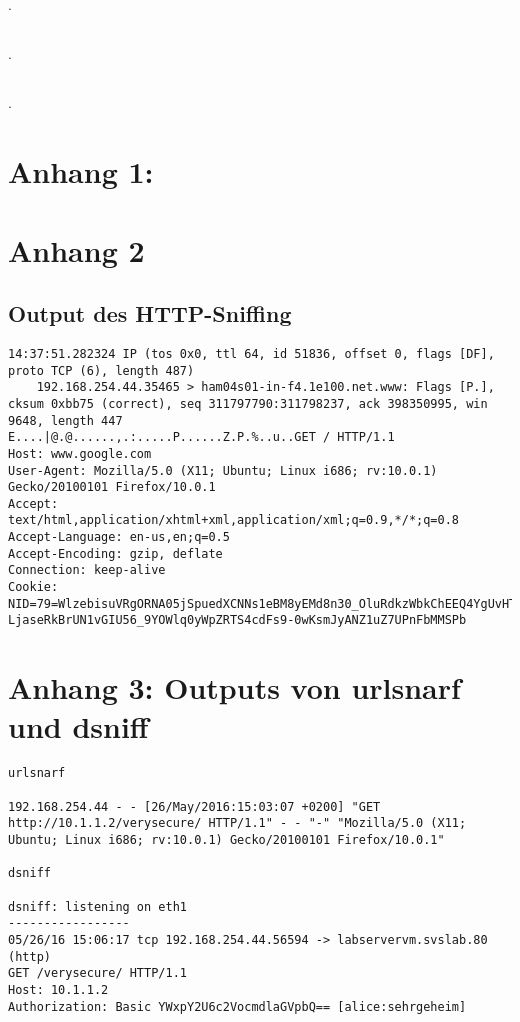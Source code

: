 \documentclass[twoside]{article}
\begin{document}
\subsection{}.
\subsection{}.
\subsection{}.

\newpage
\section*{Anhang 1:}

\section*{Anhang 2}
\subsection*{Output des HTTP-Sniffing}
\begin{lstlisting}
14:37:51.282324 IP (tos 0x0, ttl 64, id 51836, offset 0, flags [DF], proto TCP (6), length 487)
    192.168.254.44.35465 > ham04s01-in-f4.1e100.net.www: Flags [P.], cksum 0xbb75 (correct), seq 311797790:311798237, ack 398350995, win 9648, length 447
E....|@.@......,.:.....P......Z.P.%..u..GET / HTTP/1.1
Host: www.google.com
User-Agent: Mozilla/5.0 (X11; Ubuntu; Linux i686; rv:10.0.1) Gecko/20100101 Firefox/10.0.1
Accept: text/html,application/xhtml+xml,application/xml;q=0.9,*/*;q=0.8
Accept-Language: en-us,en;q=0.5
Accept-Encoding: gzip, deflate
Connection: keep-alive
Cookie: NID=79=WlzebisuVRgORNA05jSpuedXCNNs1eBM8yEMd8n30_OluRdkzWbkChEEQ4YgUvHTWB3a64hs LjaseRkBrUN1vGIU56_9YOWlq0yWpZRTS4cdFs9-0wKsmJyANZ1uZ7UPnFbMMSPb
\end{lstlisting}

\section*{Anhang 3: Outputs von urlsnarf und dsniff}
\begin{lstlisting}
urlsnarf

192.168.254.44 - - [26/May/2016:15:03:07 +0200] "GET http://10.1.1.2/verysecure/ HTTP/1.1" - - "-" "Mozilla/5.0 (X11; Ubuntu; Linux i686; rv:10.0.1) Gecko/20100101 Firefox/10.0.1"

dsniff

dsniff: listening on eth1
-----------------
05/26/16 15:06:17 tcp 192.168.254.44.56594 -> labservervm.svslab.80 (http)
GET /verysecure/ HTTP/1.1
Host: 10.1.1.2
Authorization: Basic YWxpY2U6c2VocmdlaGVpbQ== [alice:sehrgeheim] 
\end{lstlisting}
\end{document}
